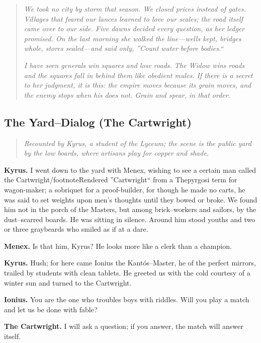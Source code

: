 \documentclass[11pt]{article}
\begin{document}
\begin{quote}
\emph{We took no city by storm that season. We closed prices instead of gates. Villages that feared our lances learned to love our scales; the road itself came over to our side. Five dawns decided every question, as her ledger promised. On the last morning she walked the line---wells kept, bridges whole, stores sealed---and said only, ''Count water before bodies.``}

\emph{I have seen generals win squares and lose roads. The Widow wins roads and the squares fall in behind them like obedient mules. If there is a secret to her judgment, it is this: the empire moves because its grain moves, and the enemy stops when his does not. Grain and spear, in that order.}
\end{quote}

\clearpage
\subsection*{The Yard--Dialog (The Cartwright)}

\begin{quote}\small\itshape
Recounted by Kyrus, a student of the Lyceum; the scene is the public yard by the low boards, where artisans play for copper and shade.
\end{quote}

\noindent\textbf{Kyrus.} I went down to the yard with Menex, wishing to see a certain man called the Cartwright/footnote{Rendered ''Cartwright`` from a Thepyrgosi term for wagon-maker; a sobriquet for a proof-builder}, for though he made no carts, he was said to set weights upon men's thoughts until they bowed or broke. We found him not in the porch of the Masters, but among brick--workers and sailors, by the dust--scarred boards. He was sitting in silence. Around him stood youths and two or three graybeards who smiled as if at a dare.

\noindent\textbf{Menex.} Is that him, Kyrus? He looks more like a clerk than a champion.

\noindent\textbf{Kyrus.} Hush; for here came Ionius the Kantós--Master, he of the perfect mirrors, trailed by students with clean tablets. He greeted us with the cold courtesy of a winter sun and turned to the Cartwright.

\noindent\textbf{Ionius.} You are the one who troubles boys with riddles. Will you play a match and let us be done with fable?

\noindent\textbf{The Cartwright.} I will ask a question; if you answer, the match will answer itself.
\end{document}
